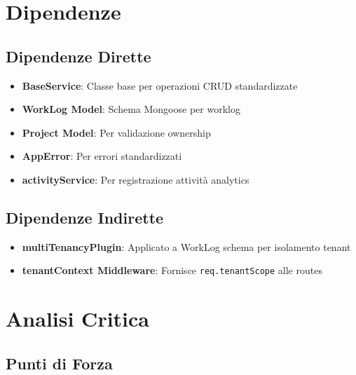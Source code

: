 \documentclass[11pt,a4paper]{article}
\begin{document}
\section{Dipendenze}

\subsection{Dipendenze Dirette}

\begin{itemize}
    \item \textbf{BaseService}: Classe base per operazioni CRUD standardizzate
    \item \textbf{WorkLog Model}: Schema Mongoose per worklog
    \item \textbf{Project Model}: Per validazione ownership
    \item \textbf{AppError}: Per errori standardizzati
    \item \textbf{activityService}: Per registrazione attività analytics
\end{itemize}

\subsection{Dipendenze Indirette}

\begin{itemize}
    \item \textbf{multiTenancyPlugin}: Applicato a WorkLog schema per isolamento tenant
    \item \textbf{tenantContext Middleware}: Fornisce \texttt{req.tenantScope} alle routes
\end{itemize}

\section{Analisi Critica}

\subsection{Punti di Forza}
\end{document}
